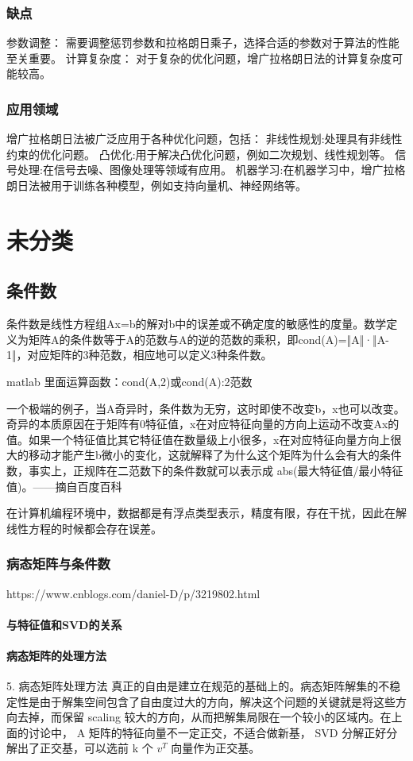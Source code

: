 \subsection{缺点}
参数调整：
需要调整惩罚参数和拉格朗日乘子，选择合适的参数对于算法的性能至关重要。
计算复杂度：
对于复杂的优化问题，增广拉格朗日法的计算复杂度可能较高。
\subsection{应用领域}
增广拉格朗日法被广泛应用于各种优化问题，包括：
非线性规划:处理具有非线性约束的优化问题。
凸优化:用于解决凸优化问题，例如二次规划、线性规划等。
信号处理:在信号去噪、图像处理等领域有应用。
机器学习:在机器学习中，增广拉格朗日法被用于训练各种模型，例如支持向量机、神经网络等。


\chapter{未分类}
\section{条件数}
条件数是线性方程组Ax=b的解对b中的误差或不确定度的敏感性的度量。数学定义为矩阵A的条件数等于A的范数与A的逆的范数的乘积，即cond(A)=‖A‖·‖A-1‖，对应矩阵的3种范数，相应地可以定义3种条件数。

matlab 里面运算函数：cond(A,2)或cond(A):2范数

一个极端的例子，当A奇异时，条件数为无穷，这时即使不改变b，x也可以改变。奇异的本质原因在于矩阵有0特征值，x在对应特征向量的方向上运动不改变Ax的值。如果一个特征值比其它特征值在数量级上小很多，x在对应特征向量方向上很大的移动才能产生b微小的变化，这就解释了为什么这个矩阵为什么会有大的条件数，事实上，正规阵在二范数下的条件数就可以表示成 abs(最大特征值/最小特征值)。——摘自百度百科

在计算机编程环境中，数据都是有浮点类型表示，精度有限，存在干扰，因此在解线性方程的时候都会存在误差。

\subsection{病态矩阵与条件数}
https://www.cnblogs.com/daniel-D/p/3219802.html
\subsubsection{与特征值和SVD的关系}
\subsubsection{病态矩阵的处理方法}
5. 病态矩阵处理方法
真正的自由是建立在规范的基础上的。病态矩阵解集的不稳定性是由于解集空间包含了自由度过大的方向，解决这个问题的关键就是将这些方向去掉，而保留 scaling 较大的方向，从而把解集局限在一个较小的区域内。在上面的讨论中， A 矩阵的特征向量不一定正交，不适合做新基， SVD 分解正好分解出了正交基，可以选前 k 个 $v^T$ 向量作为正交基。

